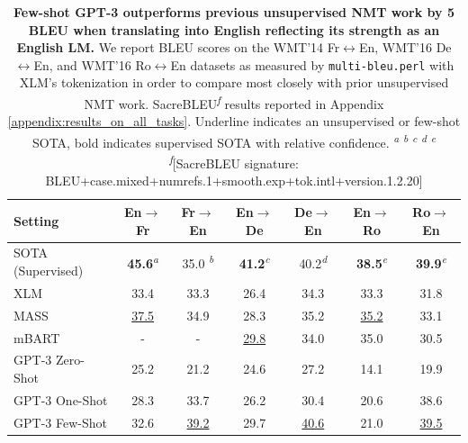 \begin{table}
    \centering
        \begin{tabular}{l c c c c c c}
        \toprule
        Setting & En$\to$Fr & Fr$\to$En & En$\to$De & De$\to$En & En$\to$Ro & Ro$\to$En \\ 
        \midrule
        SOTA (Supervised) & \textbf{45.6}\textsuperscript{\textit{a}} & 35.0 \textsuperscript{\textit{b}} & \textbf{41.2}\textsuperscript{\textit{c}} & 40.2\textsuperscript{\textit{d}} & \textbf{38.5}\textsuperscript{\textit{e}} & \textbf{39.9}\textsuperscript{\textit{e}} \\
        \midrule
        XLM \cite{lample2019cross} & 33.4 & 33.3 & 26.4 & 34.3 & 33.3 & 31.8 \\
        MASS \cite{song2019mass} & \underline{37.5} & 34.9 & 28.3 & 35.2 & \underline{35.2} & 33.1 \\
        mBART \cite{liu2020multilingual} & - & - & \underline{29.8} & 34.0 & 35.0 & 30.5 \\
        \midrule
        GPT-3 Zero-Shot  & 25.2 & 21.2 & 24.6 & 27.2 & 14.1 & 19.9 \\
        GPT-3 One-Shot & 28.3 & 33.7 & 26.2 & 30.4 & 20.6 & 38.6 \\
        GPT-3 Few-Shot & 32.6 & \underline{39.2} & 29.7 & \underline{40.6} & 21.0 & \underline{39.5} \\
        \bottomrule
        \end{tabular}
    \caption{\textbf{Few-shot GPT-3 outperforms previous unsupervised NMT work by 5 BLEU when translating into English reflecting its strength as an English LM.} We report BLEU scores on the WMT'14 Fr$\leftrightarrow$En, WMT’16 De$\leftrightarrow$En, and WMT'16 Ro$\leftrightarrow$En datasets as measured by \texttt{multi-bleu.perl} with XLM's tokenization in order to compare most closely with prior unsupervised NMT work. SacreBLEU\textsuperscript{\textit{f}} \cite{post2018call} results reported in Appendix \ref{appendix:results_on_all_tasks}. Underline indicates an unsupervised or few-shot SOTA, bold indicates supervised SOTA with relative confidence.
    \textsuperscript{\textit{a}}\cite{edunov2018understanding}
    \textsuperscript{\textit{b}}\cite{durrani2014edinburgh}
    \textsuperscript{\textit{c}}\cite{wang2018multi}
    \textsuperscript{\textit{d}}\cite{wmt16deensota} 
    \textsuperscript{\textit{e}}\cite{liu2020multilingual}
    \textsuperscript{\textit{f}}[SacreBLEU signature: BLEU+case.mixed+numrefs.1+smooth.exp+tok.intl+version.1.2.20] }
    \label{table:translation}
\end{table}